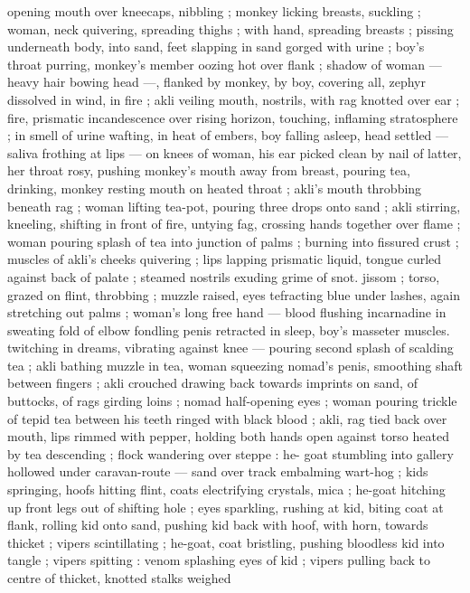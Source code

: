 opening mouth over kneecaps, nibbling ; monkey licking breasts, 
suckling ; woman, neck quivering, spreading thighs ; with hand, 
spreading breasts ; pissing underneath body, into sand, feet 
slapping in sand gorged with urine ; boy's throat purring, monkey's 
member oozing hot over flank ; shadow of woman --- heavy hair 
bowing head ---, flanked by monkey, by boy, covering all, zephyr 
dissolved in wind, in fire ; akli veiling mouth, nostrils, with rag 
knotted over ear ; fire, prismatic incandescence over rising horizon, 
touching, inflaming stratosphere ; in smell of urine wafting, in heat 
of embers, boy falling asleep, head settled --- saliva frothing at lips 
--- on knees of woman, his ear picked clean by nail of latter, her 
throat rosy, pushing monkey's mouth away from breast, pouring tea, 
drinking, monkey resting mouth on heated throat ; akli's mouth 
throbbing beneath rag ; woman lifting tea-pot, pouring three drops 
onto sand ; akli stirring, kneeling, shifting in front of fire, untying 
fag, crossing hands together over flame ; woman pouring splash of 
tea into junction of palms ; burning into fissured crust ; muscles of 
akli's cheeks quivering ; lips lapping prismatic liquid, tongue curled 
against back of palate ; steamed nostrils exuding grime of snot. 
jissom ; torso, grazed on flint, throbbing ; muzzle raised, eyes 
tefracting blue under lashes, again stretching out palms ; woman's 
long free hand --- blood flushing incarnadine in sweating fold of 
elbow fondling penis retracted in sleep, boy's masseter muscles. 
twitching in dreams, vibrating against knee --- pouring second splash 
of scalding tea ; akli bathing muzzle in tea, woman squeezing 
nomad's penis, smoothing shaft between fingers ; akli crouched 
drawing back towards imprints on sand, of buttocks, of rags girding 
loins ; nomad half-opening eyes ; woman pouring trickle of tepid tea 
between his teeth ringed with black blood ; akli, rag tied back over 
mouth, lips rimmed with pepper, holding both hands open against 
torso heated by tea descending ; flock wandering over steppe : he- 
goat stumbling into gallery hollowed under caravan-route --- sand 
over track embalming wart-hog ; kids springing, hoofs hitting flint, 
coats electrifying crystals, mica ; he-goat hitching up front legs out 
of shifting hole ; eyes sparkling, rushing at kid, biting coat at flank, 
rolling kid onto sand, pushing kid back with hoof, with horn, towards 
thicket ; vipers scintillating ; he-goat, coat bristling, pushing 
bloodless kid into tangle ; vipers spitting : venom splashing eyes of 
kid ; vipers pulling back to centre of thicket, knotted stalks weighed 
